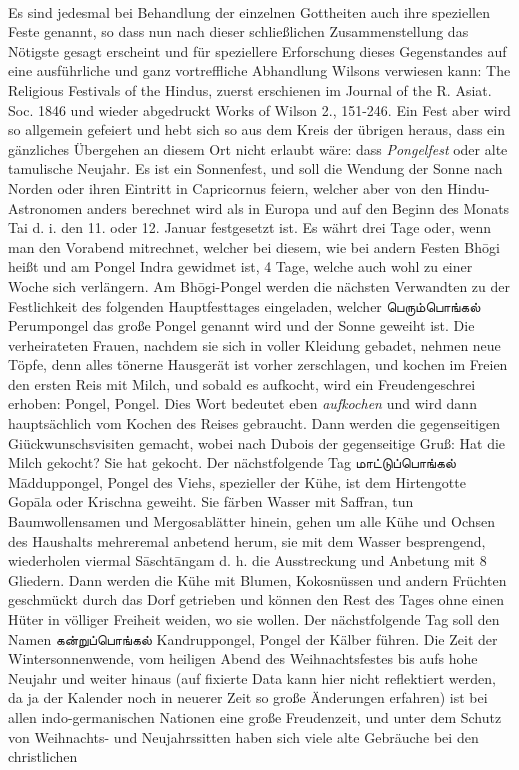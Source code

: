\documentclass{article}
\newcommand{\TamilText}[1]{\texttamil{#1}}
\newcommand{\tam}[1]{\TamilText{#1}}
\begin{document}
\begin{center}
\end{center}
\paragraph{}
Es sind jedesmal bei Behandlung der einzelnen Gottheiten auch ihre speziellen Feste genannt, so dass nun nach dieser schließlichen Zusammenstellung das Nötigste gesagt erscheint und für speziellere Erforschung dieses Gegenstandes auf eine ausführliche und ganz vortreffliche Abhandlung Wilsons verwiesen kann: The Religious Festivals of the Hindus, zuerst erschienen im Journal of the R. Asiat. Soc. 1846 und wieder abgedruckt Works of Wilson 2., 151-246. Ein Fest aber wird so allgemein gefeiert und hebt sich so aus dem Kreis der übrigen heraus, dass ein gänzliches Übergehen an diesem Ort nicht erlaubt wäre: dass \emph{Pongelfest} oder alte tamulische Neujahr. Es ist ein Sonnenfest, und soll die Wendung der Sonne nach Norden oder ihren Eintritt in Capricornus feiern, welcher aber von den Hindu-Astronomen anders berechnet wird als in Europa und auf den Beginn des Monats Tai d. i. den 11. oder 12. Januar festgesetzt ist. Es währt drei Tage oder, wenn man den Vorabend mitrechnet, welcher bei diesem, wie bei andern Festen Bh\={o}gi heißt und am Pongel Indra gewidmet ist, 4 Tage, welche auch wohl zu einer Woche sich verlängern. Am Bh\={o}gi-Pongel werden die nächsten Verwandten zu der Festlichkeit des folgenden Hauptfesttages eingeladen, welcher \tam{பெரும்பொங்கல்} Perumpongel das große Pongel genannt wird und der Sonne geweiht ist. Die verheirateten Frauen, nachdem sie sich in voller Kleidung gebadet, nehmen neue Töpfe, denn alles tönerne Hausgerät ist vorher zerschlagen, und kochen im Freien den ersten Reis mit Milch, und sobald es aufkocht, wird ein Freudengeschrei erhoben: Pongel, Pongel. Dies Wort bedeutet eben \emph{aufkochen} und wird dann hauptsächlich vom Kochen des Reises gebraucht. Dann werden die gegenseitigen Giückwunschsvisiten gemacht, wobei nach Dubois der gegenseitige Gruß: Hat die Milch gekocht? Sie hat gekocht. Der nächstfolgende Tag \tam{மாட்டுப்பொங்கல்} M\={a}dduppongel, Pongel des Viehs, spezieller der Kühe, ist dem Hirtengotte Gop\={a}la oder Krischna geweiht. Sie färben Wasser mit Saffran, tun Baumwollensamen und Mergosablätter hinein, gehen um alle Kühe und Ochsen des Haushalts mehreremal anbetend herum, sie mit dem Wasser besprengend, wiederholen viermal S\={a}scht\={a}ngam d. h. die Ausstreckung und Anbetung mit 8 Gliedern. Dann werden die Kühe mit Blumen, Kokosnüssen und andern Früchten geschmückt durch das Dorf getrieben und können den Rest des Tages ohne einen Hüter in völliger Freiheit weiden, wo sie wollen. Der nächstfolgende Tag soll den Namen \tam{கன்றுப்பொங்கல்} Kandruppongel, Pongel der Kälber führen. Die Zeit der Wintersonnenwende, vom heiligen Abend des Weihnachtsfestes bis aufs hohe Neujahr und weiter hinaus (auf fixierte Data kann hier nicht reflektiert werden, da ja der Kalender noch in neuerer Zeit so große Änderungen erfahren) ist bei allen indo-germanischen Nationen eine große Freudenzeit, und unter dem Schutz von Weihnachts- und Neujahrssitten haben sich viele alte Gebräuche bei den christlichen 
\end{document}
